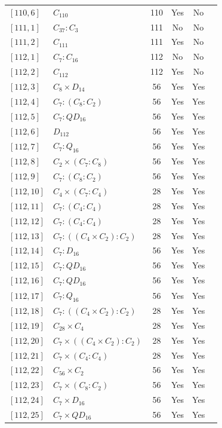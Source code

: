 \documentclass[12pt, a4paper]{article}
\theoremstyle{plain}
\theoremstyle{definition}
\begin{document}
\begin{longtable}{llcccl}
  $[110,6]$ & $C_{110}$ & 110 & Yes & No \\
  $[111,1]$ & $C_{37} : C_3$ & 111 & No & No \\
  $[111,2]$ & $C_{111}$ & 111 & Yes & No \\
  $[112,1]$ & $C_7 : C_{16}$ & 112 & No & No \\
  $[112,2]$ & $C_{112}$ & 112 & Yes & No \\
  $[112,3]$ & $C_8 \times D_{14}$ & 56 & Yes & Yes \\
  $[112,4]$ & $C_7 : (C_8 : C_2)$ & 56 & Yes & Yes \\
  $[112,5]$ & $C_7 : QD_{16}$ & 56 & Yes & Yes \\
  $[112,6]$ & $D_{112}$ & 56 & Yes & Yes \\
  $[112,7]$ & $C_7 : Q_{16}$ & 56 & Yes & Yes \\
  $[112,8]$ & $C_2 \times (C_7 : C_8)$ & 56 & Yes & Yes \\
  $[112,9]$ & $C_7 : (C_8 : C_2)$ & 56 & Yes & Yes \\
  $[112,10]$ & $C_4 \times (C_7 : C_4)$ & 28 & Yes & Yes \\
  $[112,11]$ & $C_7 : (C_4 : C_4)$ & 28 & Yes & Yes \\
  $[112,12]$ & $C_7 : (C_4 : C_4)$ & 28 & Yes & Yes \\
  $[112,13]$ & $C_7 : ((C_4 \times C_2) : C_2)$ & 28 & Yes & Yes \\
  $[112,14]$ & $C_7 : D_{16}$ & 56 & Yes & Yes \\
  $[112,15]$ & $C_7 : QD_{16}$ & 56 & Yes & Yes \\
  $[112,16]$ & $C_7 : QD_{16}$ & 56 & Yes & Yes \\
  $[112,17]$ & $C_7 : Q_{16}$ & 56 & Yes & Yes \\
  $[112,18]$ & $C_7 : ((C_4 \times C_2) : C_2)$ & 28 & Yes & Yes \\
  $[112,19]$ & $C_{28} \times C_4$ & 28 & Yes & Yes \\
  $[112,20]$ & $C_7 \times ((C_4 \times C_2) : C_2)$ & 28 & Yes & Yes \\
  $[112,21]$ & $C_7 \times (C_4 : C_4)$ & 28 & Yes & Yes \\
  $[112,22]$ & $C_{56} \times C_2$ & 56 & Yes & Yes \\
  $[112,23]$ & $C_7 \times (C_8 : C_2)$ & 56 & Yes & Yes \\
  $[112,24]$ & $C_7 \times D_{16}$ & 56 & Yes & Yes \\
  $[112,25]$ & $C_7 \times QD_{16}$ & 56 & Yes & Yes \\

\end{longtable}
\end{document}

